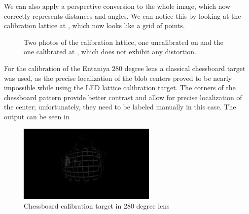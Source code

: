 We can also apply a perspective conversion to the whole image, which now correctly represents distances and angles. We can notice this by looking
at the calibration lattice at , which now looks like a grid of points.

\begin{figure}[H]
	\centering
	\caption{
		Two photos of the calibration lattice, one uncalibrated on  and the one calibrated at , which does not
		exhibit any distortion.
  }
	\label{fig:calib_c}
\end{figure}

For the calibration of the Entaniya $280$ degree lens a classical chessboard target was used, as the precise localization of the blob centers proved to be nearly impossible while using the \ac{LED} lattice calibration target. The corners of the chessboard pattern provide
better contrast and allow for precise localization of the center; unfortunately, they need to be labeled manually in this case. The output can be seen in 
\begin{figure}[H]
	\centering
	\includegraphics[width=0.6\textwidth]{./fig/photos/frame_58CEE7E0.png}
	\caption{Chessboard calibration target in 280 degree lens}
	\label{fig:calib_ent}
\end{figure}